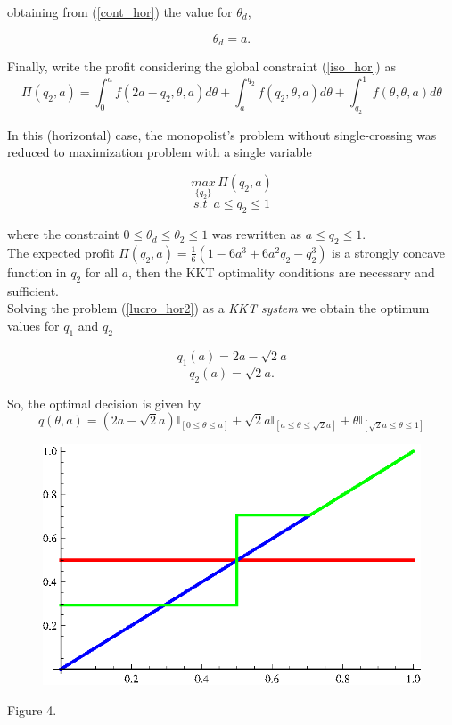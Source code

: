 \begin{itemize}
obtaining from (\ref{cont_hor}) the value for $\theta_{d}$,

$$\theta_{d}=a.$$

Finally, write the profit considering the global constraint (\ref{iso_hor}) as 
\begin{equation}
\label{lucro_hor}
\Pi(q_{2},a)=\int_{0}^{a} f(2a-q_{2},\theta,a) d\theta+ \int_{a}^{q_{2}} f(q_{2},\theta,a) d\theta+ \int_{q_{2}}^{1} f(\theta,\theta,a) d\theta
\end{equation}

In this (horizontal) case, the monopolist's problem without single-crossing was reduced to maximization problem with a single variable

\begin{equation}
\label{lucro_hor2}
 \underset{ \{q_{2}\} } { max } \, \Pi(q_{2},a)
\end{equation}
$$s.t \,\,\, a \leq q_{2}\leq 1$$

where the constraint $0 \leq \theta_{d} \leq \theta_{2} \leq 1$  was rewritten as   $a\leq q_{2}\leq 1$.\\

The expected profit $\Pi(q_{2},a)=\frac{1}{6}(1 - 6 a^3 + 6 a^2 q_{2} - q_{2}^3)$ is a strongly concave function in $q_{2}$ for all $a$, then the KKT optimality conditions are necessary and sufficient.\\

 Solving the problem  (\ref{lucro_hor2}) as a \textit{KKT system} we obtain the optimum values for $q_{1}$ and $q_{2}$ 

$$q_{1}(a)= 2a - \sqrt{2} a $$
$$q_{2}(a)= \sqrt{2} a.$$

So, the optimal decision is given by 
$$q(\theta,a)=(2a-\sqrt{2}a)\mathbb{I}_{[0\leq \theta \leq a ]} + \sqrt{2}a\mathbb{I}_{[a\leq \theta \leq \sqrt{2}a]}+\theta\mathbb{I}_{[\sqrt{2}a \leq \theta \leq 1]}$$


\begin{center}
\begin{figure}[h!]
\includegraphics[scale=0.8]{completo.eps} 
\end{figure}
Figure 4.
\end{center}


\end{itemize}
